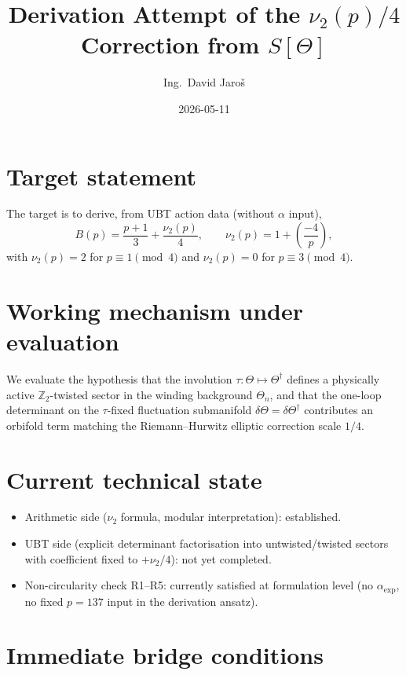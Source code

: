 \documentclass[12pt,a4paper]{article}
\title{\textbf{Derivation Attempt of the \(\nu_2(p)/4\) Correction from \(S[\Theta]\)}}
\author{Ing.\ David Jaro\v{s}}
\date{2026-05-11}
\begin{document}
  \maketitle
\fi

\section{Target statement}

The target is to derive, from UBT action data (without $\alpha$ input),
\begin{equation}
  B(p) = \frac{p+1}{3} + \frac{\nu_2(p)}{4},
  \qquad
  \nu_2(p) = 1 + \left(\frac{-4}{p}\right),
\end{equation}
with $\nu_2(p)=2$ for $p\equiv 1 \!\!\pmod 4$ and $\nu_2(p)=0$ for
$p\equiv 3 \!\!\pmod 4$.

\section{Working mechanism under evaluation}

We evaluate the hypothesis that the involution
\(\tau:\Theta\mapsto\Theta^\dagger\) defines a physically active
\(\mathbb{Z}_2\)-twisted sector in the winding background \(\Theta_n\), and that
the one-loop determinant on the \(\tau\)-fixed fluctuation submanifold
\(\delta\Theta=\delta\Theta^\dagger\) contributes an orbifold term matching the
Riemann--Hurwitz elliptic correction scale \(1/4\).

\section{Current technical state}

\begin{itemize}
  \item Arithmetic side (\(\nu_2\) formula, modular interpretation): established.
  \item UBT side (explicit determinant factorisation into untwisted/twisted
    sectors with coefficient fixed to \(+\nu_2/4\)): not yet completed.
  \item Non-circularity check R1--R5: currently satisfied at formulation level
    (no \(\alpha_{\mathrm{exp}}\), no fixed \(p=137\) input in the derivation ansatz).
\end{itemize}

\section{Immediate bridge conditions}
\end{document}
